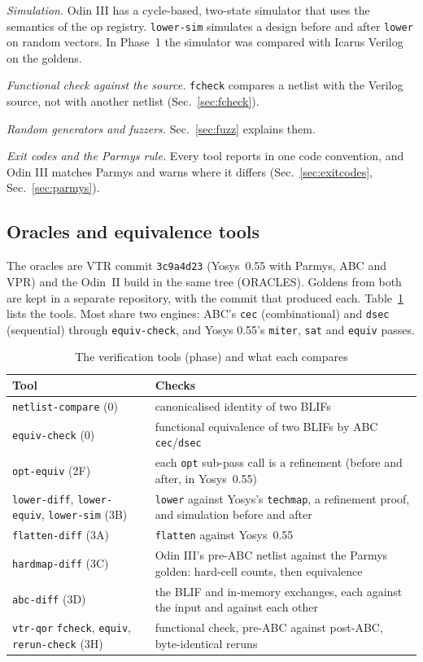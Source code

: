 \documentclass[conference]{IEEEtran}
\newcommand{\code}[1]{\texttt{#1}}
\begin{document}
\emph{Simulation.} Odin III has a cycle-based, two-state simulator that uses the semantics of the
op registry. \code{lower-sim} simulates a design before and after \code{lower} on random vectors.
In Phase~1 the simulator was compared with Icarus Verilog on the goldens.

\emph{Functional check against the source.} \code{fcheck} compares a netlist with the Verilog
source, not with another netlist (Sec.~\ref{sec:fcheck}).

\emph{Random generators and fuzzers.} Sec.~\ref{sec:fuzz} explains them.

\emph{Exit codes and the Parmys rule.} Every tool reports in one code convention, and Odin III
matches Parmys and warns where it differs (Sec.~\ref{sec:exitcodes}, Sec.~\ref{sec:parmys}).

\subsection{Oracles and equivalence tools}

The oracles are VTR commit \code{3c9a4d23} (Yosys~0.55 with Parmys, ABC and VPR) and the Odin~II
build in the same tree (ORACLES). Goldens from both are kept in a separate repository, with the
commit that produced each. Table~\ref{tab:tools} lists the tools. Most share two engines: ABC's
\code{cec} (combinational) and \code{dsec} (sequential) through \code{equiv-check}, and Yosys
0.55's \code{miter}, \code{sat} and \code{equiv} passes.

\begin{table}[t]
\caption{The verification tools (phase) and what each compares}
\label{tab:tools}
\centering
\footnotesize
\begin{tabular}{@{}>{\raggedright\arraybackslash}p{}%
  >{\raggedright\arraybackslash}p{}@{}}
\toprule
Tool & Checks \\
\midrule
\code{netlist-compare} (0) & canonicalised identity of two BLIFs \\
\code{equiv-check} (0) & functional equivalence of two BLIFs by ABC \code{cec}/\code{dsec} \\
\code{opt-equiv} (2F) & each \code{opt} sub-pass call is a refinement (before and after, in Yosys~0.55) \\
\code{lower-diff}, \code{lower-equiv}, \code{lower-sim} (3B) & \code{lower} against Yosys's
  \code{techmap}, a refinement proof, and simulation before and after \\
\code{flatten-diff} (3A) & \code{flatten} against Yosys~0.55 \\
\code{hardmap-diff} (3C) & Odin III's pre-ABC netlist against the Parmys golden: hard-cell
  counts, then equivalence \\
\code{abc-diff} (3D) & the BLIF and in-memory exchanges, each against the input and against each
  other \\
\code{vtr-qor} \code{fcheck}, \code{equiv}, \code{rerun-check} (3H) & functional check, pre-ABC
  against post-ABC, byte-identical reruns \\
\bottomrule
\end{tabular}
\end{table}
\end{document}
